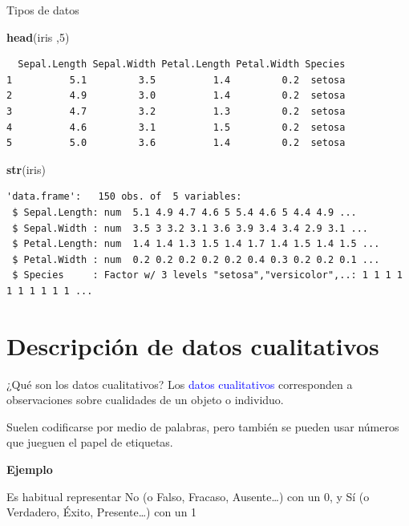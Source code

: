 \documentclass[
  ignorenonframetext,
]{beamer}
\newenvironment{Shaded}{\begin{snugshade}}{\end{snugshade}}
\newcommand{\DecValTok}[1]{\textcolor[rgb]{0.00,0.00,0.81}{#1}}
\newcommand{\FunctionTok}[1]{\textcolor[rgb]{0.13,0.29,0.53}{\textbf{#1}}}
\newcommand{\NormalTok}[1]{#1}
\newcommand\blue[1]{\textcolor{blue}{#1}}
\begin{document}
\begin{frame}[fragile]{Tipos de datos}
\label{tipos-de-datos-3}
\begin{Shaded}
\begin{Highlighting}[]
\FunctionTok{head}\NormalTok{(iris ,}\DecValTok{5}\NormalTok{)}
\end{Highlighting}
\end{Shaded}

\begin{verbatim}
  Sepal.Length Sepal.Width Petal.Length Petal.Width Species
1          5.1         3.5          1.4         0.2  setosa
2          4.9         3.0          1.4         0.2  setosa
3          4.7         3.2          1.3         0.2  setosa
4          4.6         3.1          1.5         0.2  setosa
5          5.0         3.6          1.4         0.2  setosa
\end{verbatim}

\begin{Shaded}
\begin{Highlighting}[]
\FunctionTok{str}\NormalTok{(iris)}
\end{Highlighting}
\end{Shaded}

\begin{verbatim}
'data.frame':   150 obs. of  5 variables:
 $ Sepal.Length: num  5.1 4.9 4.7 4.6 5 5.4 4.6 5 4.4 4.9 ...
 $ Sepal.Width : num  3.5 3 3.2 3.1 3.6 3.9 3.4 3.4 2.9 3.1 ...
 $ Petal.Length: num  1.4 1.4 1.3 1.5 1.4 1.7 1.4 1.5 1.4 1.5 ...
 $ Petal.Width : num  0.2 0.2 0.2 0.2 0.2 0.4 0.3 0.2 0.2 0.1 ...
 $ Species     : Factor w/ 3 levels "setosa","versicolor",..: 1 1 1 1 1 1 1 1 1 1 ...
\end{verbatim}
\end{frame}

\section{Descripción de datos
cualitativos}\label{descripciuxf3n-de-datos-cualitativos}

\begin{frame}{¿Qué son los datos cualitativos?}
\label{quuxe9-son-los-datos-cualitativos}
Los \blue{datos cualitativos} corresponden a observaciones sobre
cualidades de un objeto o individuo.

Suelen codificarse por medio de palabras, pero también se pueden usar
números que jueguen el papel de etiquetas.

\textbf{Ejemplo}

Es habitual representar No (o Falso, Fracaso, Ausente\ldots) con un 0, y
Sí (o Verdadero, Éxito, Presente\ldots) con un 1
\end{frame}
\end{document}

